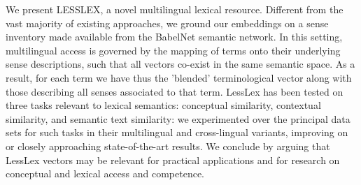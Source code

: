 We present LESSLEX, a novel multilingual lexical resource. Different from the vast majority of existing approaches, we ground our embeddings on a sense inventory made available from the BabelNet semantic network. In this setting, multilingual access is governed by the mapping of terms onto their underlying sense descriptions, such that all vectors co-exist in the same semantic space. As a result, for each term we have thus the 'blended' terminological vector along with those describing all senses associated to that term. LessLex has been tested on three tasks relevant to lexical semantics: conceptual similarity, contextual similarity, and semantic text similarity: we experimented over the principal data sets for such tasks in their multilingual and cross-lingual variants, improving on or closely approaching state-of-the-art results. We conclude by arguing that LessLex vectors may be relevant for practical applications and for research on conceptual and lexical access and competence.